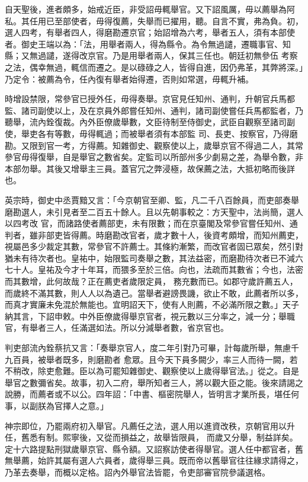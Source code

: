 \begin{pinyinscope}
 自天聖後，進者頗多，始戒近臣，非受詔毋輒舉官。又下詔風厲，毋以薦舉為阿私。其任用已至部使者，毋得復薦，失舉而已擢用，聽。自言不實，弗為負。初，選人四考，有舉者四人，得磨勘遷京官；始詔增為六考，舉者五人，須有本部使者。御史王端以為：「法，用舉者兩人，得為縣令。為令無過譴，遷職事官、知縣；又無過譴，遂得改京官。乃是用舉者兩人，保其三任也。朝廷初無參伍
 考察之法，偶幸無過，輒信而遷之。是以碌碌之人，皆得自進，因仍弗革，其弊將深。」乃定令：被薦為令，任內復有舉者始得遷，否則如常選，毋輒升補。



 時增設禁限，常參官已授外任，毋得奏舉。京官見任知州、通判，升朝官兵馬都監、諸司副使以上，及在京員外郎嘗任知州、通判，諸司副使嘗任兵馬都監者，乃聽舉，流內銓復裁。內外臣僚歲舉數，文臣待制至侍御史，武臣自觀察至諸司副使，舉吏各有等數，毋得輒過；而被舉者須有本部監
 司、長吏、按察官，乃得磨勘。又限到官一考，方得薦。知雜御史、觀察使以上，歲舉京官不得過二人，其常參官毋得復舉，自是舉官之數省矣。定監司以所部州多少劇易之差，為舉令數，非本部勿舉。其後又增舉主三員。蓋官冗之弊浸極，故保薦之法，大抵初略而後詳也。



 英宗時，御史中丞賈黯又言：「今京朝官至卿、監，凡二千八百餘員，而吏部奏舉磨勘選人，未引見者至二百五十餘人。且以先朝事較之：方天聖中，法尚簡，選人以四考改
 官，而諸路使者薦部吏，未有限數；而在京臺閣及常參官嘗任知州、通判者，雖非部吏皆得薦。時磨勘改官者，歲才數十人，後資考頗增，而知州薦吏，視屬邑多少裁定其數，常參官不許薦士。其條約漸繁，而改官者固已眾矣，然引對猶未有待次者也。皇祐中，始限監司奏舉之數，其法益密，而磨勘待次者已不減六七十人。皇祐及今才十年耳，而猥多至於三倍。向也，法疏而其數省；今也，法密而其數增，此何故哉？正在薦吏者歲限定員，
 務充數而已。如郡守歲許薦五人，而歲終不滿其數，則人人以為遺己。當舉者避謗畏譏，欲止不敢，此薦者所以多，而真才實廉未免混於無能也。宜明詔天下，使有人則薦，不必滿所限之數。」天子納其言，下詔申敕。中外臣僚歲得舉京官者，視元數以三分率之，減一分；舉職官，有舉者三人，任滿選如法。所以分減舉者數，省京官也。



 判吏部流內銓蔡抗又言：「奏舉京官人，度二年引對乃可畢，計每歲所舉，無慮千九百員，被舉者既多，則磨勘者
 愈眾。且今天下員多闕少，率三人而待一闕，若不稍改，除吏愈難。臣以為可罷知雜御史、觀察使以上歲得舉官法。」從之。自是舉官之數彌省矣。故事，初入二府，舉所知者三人，將以觀大臣之能。後來請謁之說勝，而薦者或不以公。四年詔：「中書、樞密院舉人，皆明言才業所長，堪任何事，以副朕為官擇人之意。」



 神宗即位，乃罷兩府初入舉官。凡薦任之法，選人用以進資改秩，京朝官用以升任，舊悉有制。熙寧後，又從而損益之，故舉皆限員，
 而歲又分舉，制益詳矣。定十六路提點刑獄歲舉京官、縣令額。又詔察訪使者得舉官。選人任中都官者，舊無舉薦，始許其屬有選人六員者，歲得舉三員。既而帝以舊舉官往往緣求請得之，乃革去奏舉，而概以定格。詔內外舉官法皆罷，令吏部審官院參議選格。




\end{pinyinscope}
